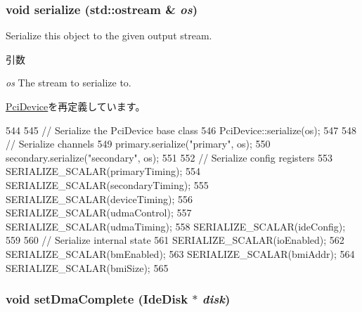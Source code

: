 \hypertarget{classIdeController_a53e036786d17361be4c7320d39c99b84}{
\subsubsection[{serialize}]{\setlength{\rightskip}{0pt plus 5cm}void serialize (std::ostream \& {\em os})}}
\label{classIdeController_a53e036786d17361be4c7320d39c99b84}
Serialize this object to the given output stream. 
\begin{DoxyParams}{引数}
\item[{\em os}]The stream to serialize to. \end{DoxyParams}


\hyperlink{classPciDevice_a53e036786d17361be4c7320d39c99b84}{PciDevice}を再定義しています。


\begin{DoxyCode}
544 {
545     // Serialize the PciDevice base class
546     PciDevice::serialize(os);
547 
548     // Serialize channels
549     primary.serialize("primary", os);
550     secondary.serialize("secondary", os);
551 
552     // Serialize config registers
553     SERIALIZE_SCALAR(primaryTiming);
554     SERIALIZE_SCALAR(secondaryTiming);
555     SERIALIZE_SCALAR(deviceTiming);
556     SERIALIZE_SCALAR(udmaControl);
557     SERIALIZE_SCALAR(udmaTiming);
558     SERIALIZE_SCALAR(ideConfig);
559 
560     // Serialize internal state
561     SERIALIZE_SCALAR(ioEnabled);
562     SERIALIZE_SCALAR(bmEnabled);
563     SERIALIZE_SCALAR(bmiAddr);
564     SERIALIZE_SCALAR(bmiSize);
565 }
\end{DoxyCode}
\hypertarget{classIdeController_ab3f8a4d9fa9f33c71d23a803142e9faa}{
\subsubsection[{setDmaComplete}]{\setlength{\rightskip}{0pt plus 5cm}void setDmaComplete ({\bf IdeDisk} $\ast$ {\em disk})}}
\label{classIdeController_ab3f8a4d9fa9f33c71d23a803142e9faa}



